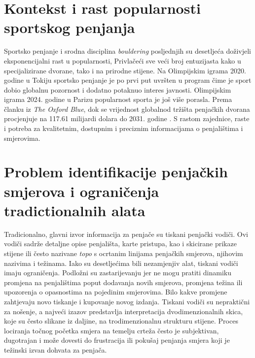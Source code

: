 \section{Kontekst i rast popularnosti sportskog penjanja} 

Sportsko penjanje i srodna disciplina \textit{bouldering} posljednjih su desetljeća doživjeli eksponencijalni rast u popularnosti, Privlačeći sve veći broj entuzijasta kako u specijalizirane dvorane, tako i na prirodne stijene. Na Olimpijskim igrama 2020. godine u Tokiju sportsko penjanje je po prvi put uvršten u program čime je sport dobio globalnu pozornost i dodatno potaknuo interes javnosti. Olimpijskim igrama 2024. godine u Parizu popularnost sporta je još više porasla. Prema članku iz \textit{The Oxford Blue}, dok se vrijednost globalnod tržišta penjačkih dvorana procjenjuje na 117.61 milijardi dolara do 2031. godine \cite{the_oxford_blue_rock_climb}. S rastom zajednice, raste i potreba za kvalitetnim, dostupnim i preciznim informacijama o penjalištima i smjerovima.

\section{Problem identifikacije penjačkih smjerova i ograničenja tradictionalnih alata}

Tradicionalno, glavni izvor informacija za penjače su tiskani penjački vodiči. Ovi vodiči sadrže detaljne opise penjališta, karte pristupa, kao i skicirane prikaze stijene ili često nazivane \textit{topo} s ocrtanim linijama penjačkih smjerova, njihovim nazivima i težinama. Iako su desetljećima bili nezamjenjiv alat, tiskani vodiči imaju ograničenja. Podložni su zastarijevanju jer ne mogu pratiti dinamiku promjena na penjalištima poput dodavanja novih smjerova, promjena težina ili upozorenja o opasnostima na pojedinim smjerovima. Bilo kakve promjene zahtjevaju novo tiskanje i kupovanje novog izdanja. Tiskani vodiči su nepraktični za nošenje, a najveći izazov predstavlja interpretacija dvodimenzionalnih skica, koje su često slikane iz daljine, na trodimenzionalnu strukturu stijene. Proces lociranja točnog početka smjera na temelju crteža često je subjektivan, dugotrajan i može dovesti do frustracija ili pokušaj penjanja smjera koji je težinski izvan dohvata za penjača. 

